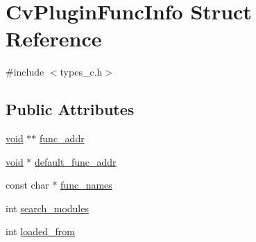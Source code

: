 \hypertarget{structCvPluginFuncInfo}{\section{Cv\-Plugin\-Func\-Info Struct Reference}
\label{structCvPluginFuncInfo}
}


{\ttfamily \#include $<$types\-\_\-c.\-h$>$}

\subsection*{Public Attributes}
\begin{DoxyCompactItemize}
\item 
\hyperlink{legacy_8hpp_a8bb47f092d473522721002c86c13b94e}{void} $\ast$$\ast$ \hyperlink{structCvPluginFuncInfo_a0f8c5dc69cbf48ba580bb8bc226622c6}{func\-\_\-addr}
\item 
\hyperlink{legacy_8hpp_a8bb47f092d473522721002c86c13b94e}{void} $\ast$ \hyperlink{structCvPluginFuncInfo_adc995825bf8276f1332a9724014b753d}{default\-\_\-func\-\_\-addr}
\item 
const char $\ast$ \hyperlink{structCvPluginFuncInfo_a91d414b5fe9137f058f1f0ff78bca630}{func\-\_\-names}
\item 
int \hyperlink{structCvPluginFuncInfo_aa205748f720a82d01edc1c4865e115fe}{search\-\_\-modules}
\item 
int \hyperlink{structCvPluginFuncInfo_a32b220f7101b603e2208e7a1b48611af}{loaded\-\_\-from}
\end{DoxyCompactItemize}


